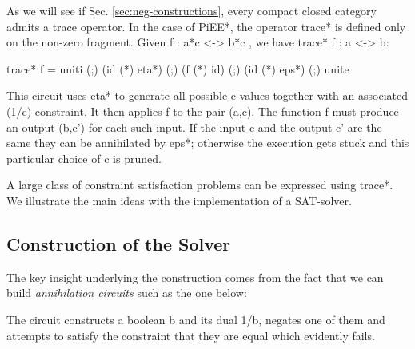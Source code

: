 \documentclass[preprint]{sigplanconf}
\begin{document}
As we will see if Sec. \ref{sec:neg-constructions}, every compact
closed category admits a {{trace}} operator. In the case of {{PiEE*}},
the operator {{trace*}} is defined only on the non-zero fragment.
Given {{f : a*c <-> b*c }}, we have {{trace* f : a <-> b}}:

{{ trace* f = uniti (;) (id (*) eta*) (;) (f (*) id) (;) (id (*) eps*) (;) unite }}

\noindent This circuit uses {{eta*}} to generate all possible {{c}}-values
together with an associated {{(1/c)}}-constraint. It then applies {{f}} to the
pair {{(a,c)}}. The function {{f}} must produce an output {{(b,c')}} for each
such input. If the input {{c}} and the output {{c'}} are the same they can be
annihilated by {{eps*}}; otherwise the execution gets stuck and this
particular choice of {{c}} is pruned. 


A large class of constraint satisfaction problems can be expressed
using {{trace*}}. We illustrate the main ideas with the implementation
of a SAT-solver.  


\subsection{Construction of the Solver}

The key insight underlying the construction comes from the fact that we can
build \emph{annihilation circuits} such as the one below:

\begin{center}
\end{center}
The circuit constructs a boolean {{b}} and its dual {{1/b}}, negates one of
them and attempts to satisfy the constraint that they are equal which
evidently fails. 
\end{document}
